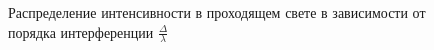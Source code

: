 \begin{figure}[h!]
  \caption{Распределение интенсивности в проходящем свете в зависимости от порядка интерференции $\frac{\Delta}{\lambda}$}
  \label{img::2}
\end{figure}